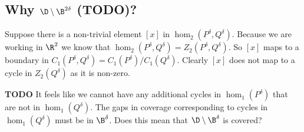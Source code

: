 \clearpage
\subsection{Why $\D\setminus\B^{2\delta}$ (TODO)?}

%
%
%
%



Suppose there is a non-trivial element $[x]$ in $\hom_2(P^\delta, Q^\delta)$.
Because we are working in $\R^2$ we know that $\hom_2(P^\delta, Q^\delta) = Z_2(P^\delta, Q^\delta)$.
So $[x]$ maps to a boundary in $C_1(P^\delta, Q^\delta) = C_1(P^\delta) / C_1(Q^\delta)$.
Clearly $[x]$ does not map to a cycle in $Z_2(Q^\delta)$ as it is non-zero.

\textbf{TODO} It feels like we cannot have any additional cycles in $\hom_1(P^\delta)$ that are not in $\hom_1(Q^\delta)$.
The gaps in coverage corresponding to cycles in $\hom_1(Q^\delta)$ must be in $\B^\delta$.
Does this mean that $\D\setminus\B^\delta$ is covered?


